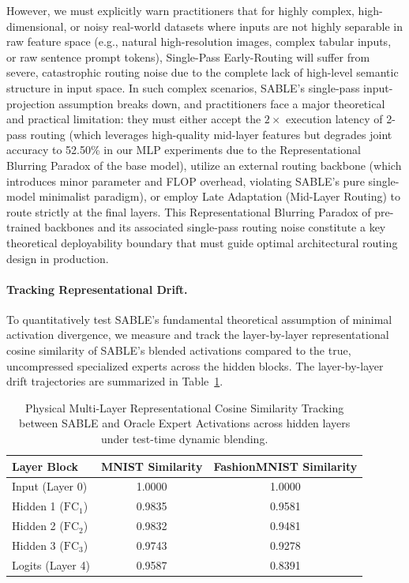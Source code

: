 However, we must explicitly warn practitioners that for highly complex, high-dimensional, or noisy real-world datasets where inputs are not highly separable in raw feature space (e.g., natural high-resolution images, complex tabular inputs, or raw sentence prompt tokens), Single-Pass Early-Routing will suffer from severe, catastrophic routing noise due to the complete lack of high-level semantic structure in input space. In such complex scenarios, SABLE's single-pass input-projection assumption breaks down, and practitioners face a major theoretical and practical limitation: they must either accept the $2\times$ execution latency of 2-pass routing (which leverages high-quality mid-layer features but degrades joint accuracy to 52.50\% in our MLP experiments due to the Representational Blurring Paradox of the base model), utilize an external routing backbone (which introduces minor parameter and FLOP overhead, violating SABLE's pure single-model minimalist paradigm), or employ Late Adaptation (Mid-Layer Routing) to route strictly at the final layers. This Representational Blurring Paradox of pre-trained backbones and its associated single-pass routing noise constitute a key theoretical deployability boundary that must guide optimal architectural routing design in production.

\paragraph{Tracking Representational Drift.} To quantitatively test SABLE's fundamental theoretical assumption of minimal activation divergence, we measure and track the layer-by-layer representational cosine similarity of SABLE's blended activations compared to the true, uncompressed specialized experts across the hidden blocks. The layer-by-layer drift trajectories are summarized in Table~\ref{tab:drift_results}.

\begin{table}[htbp]
\caption{Physical Multi-Layer Representational Cosine Similarity Tracking between SABLE and Oracle Expert Activations across hidden layers under test-time dynamic blending.}
\label{tab:drift_results}
\vskip 0.1in
\begin{center}
\begin{small}
\begin{sc}
\begin{tabular}{lcc}
\toprule
Layer Block & MNIST Similarity & FashionMNIST Similarity \\
\midrule
Input (Layer 0) & 1.0000 & 1.0000 \\
Hidden 1 ($\text{FC}_1$) & 0.9835 & 0.9581 \\
Hidden 2 ($\text{FC}_2$) & 0.9832 & 0.9481 \\
Hidden 3 ($\text{FC}_3$) & 0.9743 & 0.9278 \\
Logits (Layer 4) & 0.9587 & 0.8391 \\
\bottomrule
\end{tabular}
\end{sc}
\end{small}
\end{center}
\vskip -0.1in
\end{table}

